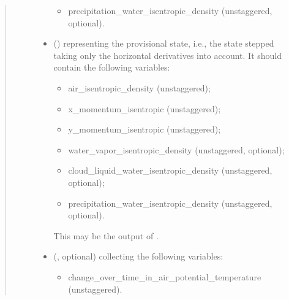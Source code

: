 \documentclass[letterpaper,10pt,english]{sphinxmanual}
\begin{document}
\begin{fulllineitems}
\begin{fulllineitems}
\begin{quote}
\begin{description}
\begin{itemize}
\begin{itemize}
\item {} 
precipitation\_water\_isentropic\_density (unstaggered, optional).

\end{itemize}


\item {} 
 () \textendash{} 
{\hyperref[\detokenize{api:storages.state_isentropic.StateIsentropic}]{}} representing the provisional state, i.e.,
the state stepped taking only the horizontal derivatives into account.
It should contain the following variables:
\begin{itemize}
\item {} 
air\_isentropic\_density (unstaggered);

\item {} 
x\_momentum\_isentropic (unstaggered);

\item {} 
y\_momentum\_isentropic (unstaggered);

\item {} 
water\_vapor\_isentropic\_density (unstaggered, optional);

\item {} 
cloud\_liquid\_water\_isentropic\_density (unstaggered, optional);

\item {} 
precipitation\_water\_isentropic\_density (unstaggered, optional).

\end{itemize}

This may be the output of {\hyperref[\detokenize{api:dycore.prognostic_isentropic.PrognosticIsentropic.step_neglecting_vertical_advection}]{}}.


\item {} 
 (, optional) \textendash{} 
{\hyperref[\detokenize{api:storages.grid_data.GridData}]{}} collecting the following variables:
\begin{itemize}
\item {} 
change\_over\_time\_in\_air\_potential\_temperature (unstaggered).

\end{itemize}


\end{itemize}


\end{description}
\end{quote}
\end{fulllineitems}
\end{fulllineitems}
\end{document}

